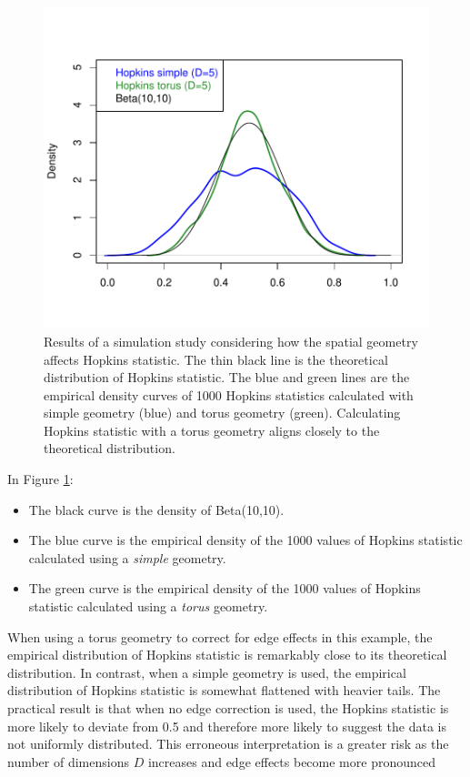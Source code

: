 \begin{figure}

{\centering \includegraphics[width=0.9\linewidth]{hopkins_files/figure-latex/torus-1} 

}

\caption{Results of a simulation study considering how the spatial geometry affects Hopkins statistic. The thin black line is the theoretical distribution of Hopkins statistic. The blue and green lines are the empirical density curves of 1000 Hopkins statistics calculated with simple geometry (blue) and torus geometry (green). Calculating Hopkins statistic with a torus geometry aligns closely to the theoretical distribution.}\label{fig:torus}
\end{figure}

In Figure \ref{fig:torus}:

\begin{itemize}
\tightlist
\item
  The black curve is the density of Beta(10,10).
\item
  The blue curve is the empirical density of the 1000 values of Hopkins statistic calculated using a \emph{simple} geometry.
\item
  The green curve is the empirical density of the 1000 values of Hopkins statistic calculated using a \emph{torus} geometry.
\end{itemize}

When using a torus geometry to correct for edge effects in this example, the empirical distribution of Hopkins statistic is remarkably close to its theoretical distribution. In contrast, when a simple geometry is used, the empirical distribution of Hopkins statistic is somewhat flattened with heavier tails. The practical result is that when no edge correction is used, the Hopkins statistic is more likely to deviate from 0.5 and therefore more likely to suggest the data is not uniformly distributed. This erroneous interpretation is a greater risk as the number of dimensions \(D\) increases and edge effects become more pronounced

